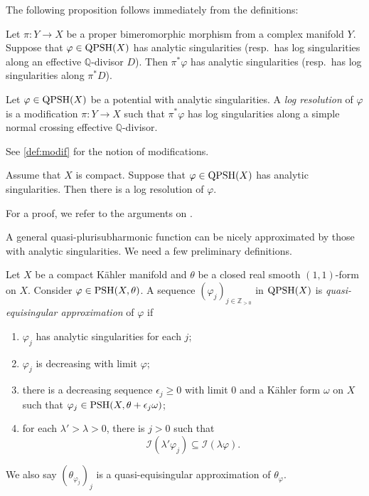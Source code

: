 The following proposition follows immediately from the definitions:
\begin{proposition}\label{prop:pshfunctions:L1425}
    Let $\pi\colon Y\rightarrow X$ be a proper bimeromorphic morphism from a complex manifold $Y$.
    Suppose that $\varphi\in \mathrm{QPSH}(X)$ has analytic singularities (resp.\ has log singularities along an effective $\mathbb{Q}$-divisor $D$).
    Then $\pi^*\varphi$ has analytic singularities (resp.\ has log singularities along $\pi^*D$).
\end{proposition}

\begin{definition}\label{def:logres}
    Let $\varphi\in \mathrm{QPSH}(X)$ be a potential with analytic singularities.
    A \emph{log resolution} of $\varphi$ is a modification $\pi\colon Y\rightarrow X$ such that $\pi^*\varphi$ has log singularities along a simple normal crossing effective $\mathbb{Q}$-divisor.
\end{definition}
See \cref{def:modif} for the notion of modifications.

\begin{theorem}\label{thm:resolvelogsing}
    Assume that $X$ is compact.
    Suppose that $\varphi\in \mathrm{QPSH}(X)$ has analytic singularities. Then there is a log resolution of $\varphi$.
\end{theorem}
For a proof, we refer to the arguments on \cite[Page~104]{MM07}.


A general quasi-plurisubharmonic function can be nicely approximated by those with analytic singularities. We need a few preliminary definitions.
\begin{definition}\label{def:quasiequsing}
    Let $X$ be a compact Kähler manifold and $\theta$ be a closed real smooth $(1,1)$-form on $X$. Consider $\varphi\in \mathrm{PSH}(X,\theta)$. A sequence $(\varphi_j)_{j\in \mathbb{Z}_{>0}}$ in $\mathrm{QPSH}(X)$ is \emph{quasi-equisingular approximation}  of $\varphi$ if
    \begin{enumerate}
        \item\label{itm:def:quasiequsing:1} $\varphi_j$ has analytic singularities for each $j$;
        \item\label{itm:def:quasiequsing:2} $\varphi_j$ is decreasing with limit $\varphi$;
        \item\label{itm:def:quasiequsing:3} there is a decreasing sequence $\epsilon_j\geq 0$ with limit $0$ and a Kähler form $\omega$ on $X$ such that $\varphi_j\in \mathrm{PSH}(X,\theta+\epsilon_j\omega)$;
        \item\label{itm:def:quasiequsing:4} for each $\lambda'>\lambda>0$, there is $j>0$ such that
        \begin{equation}\label{eq:quasi_eq_prop}
        \mathcal{I}(\lambda' \varphi_j)\subseteq \mathcal{I}(\lambda \varphi).
        \end{equation}
    \end{enumerate}
    We also say $(\theta_{\varphi_j})_j$ is a quasi-equisingular approximation of $\theta_{\varphi}$.
\end{definition}

